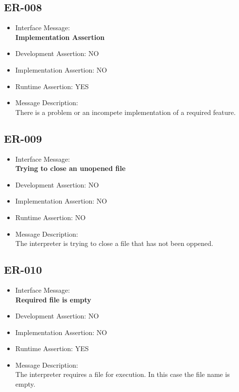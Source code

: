 \subsection{ER-008}
\begin{itemize}
  \item Interface Message:\\[1em]
    \textbf{Implementation Assertion}
  \item Development Assertion: NO
  \item Implementation Assertion: NO
  \item Runtime Assertion: YES
  \item Message Description:\\[1em]
    There is a problem or an incompete implementation of a required feature.
\end{itemize}

\subsection{ER-009}
\begin{itemize}
  \item Interface Message:\\[1em]
    \textbf{Trying to close an unopened file}
  \item Development Assertion: NO
  \item Implementation Assertion: NO
  \item Runtime Assertion: NO
  \item Message Description:\\[1em]
    The interpreter is trying to close a file that has not been oppened.
\end{itemize}

\subsection{ER-010}
\begin{itemize}
  \item Interface Message:\\[1em]
    \textbf{Required file is empty}
  \item Development Assertion: NO
  \item Implementation Assertion: NO
  \item Runtime Assertion: YES
  \item Message Description:\\[1em]
    The interpreter requires a file for execution. In this case the file name is empty.
\end{itemize}

